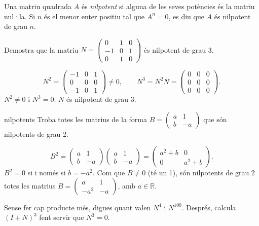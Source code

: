 Una matriu quadrada $A$ és \emph{nilpotent} si alguna de les seves potències és la matriu nul·la. Si $n$
és el menor enter positiu tal que $A^n=0$, es diu que $A$ és nilpotent de grau $n$.

\begin{apartats}

Demostra que la matriu $N=\begin{pmatrix}0&1&0\\-1&0&1\\0&1&0\end{pmatrix}$ és nilpotent de grau 3.

\begin{solucio}
\[
N^2=\begin{pmatrix}-1&0&1\\0&0&0\\-1&0&1\end{pmatrix}\ne0,\qquad
N^3=N^2N=\begin{pmatrix}0&0&0\\0&0&0\\0&0&0\end{pmatrix}.
\]
$N^2\ne0$ i $N^3=0$: $N$ és nilpotent de grau 3.
\end{solucio}

\begin{tria}{nilpotents}
Troba totes les matrius de la forma $B=\begin{pmatrix}a&1\\b&-a\end{pmatrix}$ que són nilpotents de
grau 2.

\begin{solucio}
\[
B^2=\begin{pmatrix}a&1\\b&-a\end{pmatrix}\begin{pmatrix}a&1\\b&-a\end{pmatrix}
=\begin{pmatrix}a^2+b&0\\0&a^2+b\end{pmatrix}.
\]
$B^2=0$ si i només si $b=-a^2$. Com que $B\ne0$ (té un 1), són nilpotents de grau 2 totes les matrius
$B=\begin{pmatrix}a&1\\-a^2&-a\end{pmatrix}$, amb $a\in\mathbb R$.
\end{solucio}

Sense fer cap producte més, digues quant valen $N^4$ i $N^{100}$. Després, calcula $(I+N)^3$ fent servir
que $N^3=0$.


\end{tria}
\end{apartats}
